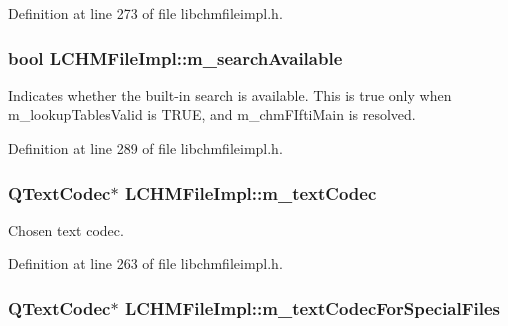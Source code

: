 Definition at line 273 of file libchmfileimpl.\+h.

\hypertarget{classLCHMFileImpl_a7f5f505b00220199785298bdad0627f6}{
\subsubsection[{m\+\_\+search\+Available}]{\setlength{\rightskip}{0pt plus 5cm}bool L\+C\+H\+M\+File\+Impl\+::m\+\_\+search\+Available}}\label{classLCHMFileImpl_a7f5f505b00220199785298bdad0627f6}
Indicates whether the built-\/in search is available. This is true only when m\+\_\+lookup\+Tables\+Valid is T\+R\+U\+E, and m\+\_\+chm\+F\+Ifti\+Main is resolved. 

Definition at line 289 of file libchmfileimpl.\+h.

\hypertarget{classLCHMFileImpl_a2f941b3f26a4f845d3e785cfad0eeb58}{
\subsubsection[{m\+\_\+text\+Codec}]{\setlength{\rightskip}{0pt plus 5cm}Q\+Text\+Codec$\ast$ L\+C\+H\+M\+File\+Impl\+::m\+\_\+text\+Codec}}\label{classLCHMFileImpl_a2f941b3f26a4f845d3e785cfad0eeb58}


Chosen text codec. 



Definition at line 263 of file libchmfileimpl.\+h.

\hypertarget{classLCHMFileImpl_ad50032706377cebb647d43f348904942}{
\subsubsection[{m\+\_\+text\+Codec\+For\+Special\+Files}]{\setlength{\rightskip}{0pt plus 5cm}Q\+Text\+Codec$\ast$ L\+C\+H\+M\+File\+Impl\+::m\+\_\+text\+Codec\+For\+Special\+Files}}\label{classLCHMFileImpl_ad50032706377cebb647d43f348904942}



